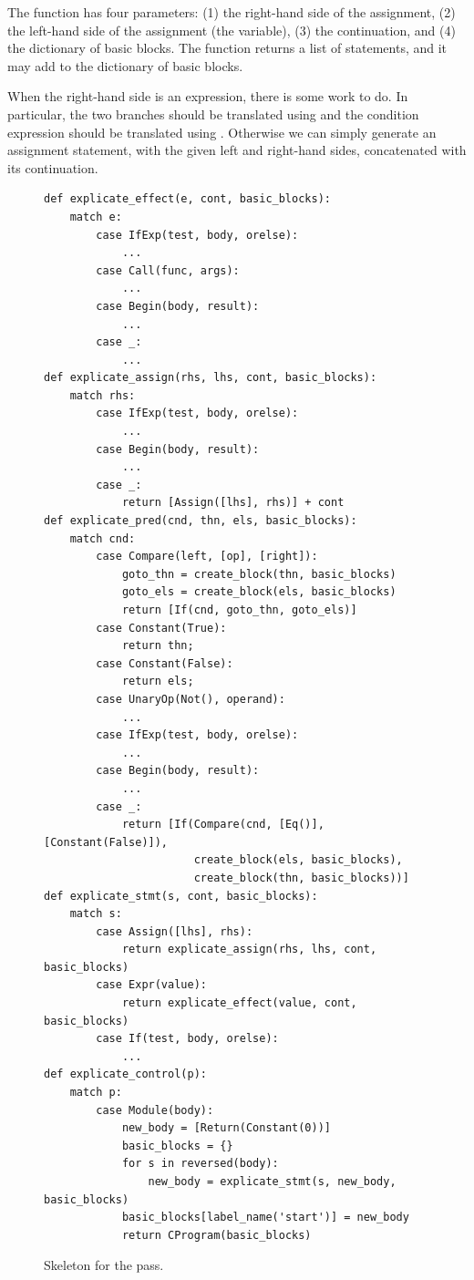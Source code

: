 \documentclass[7x10]{TimesAPriori_MIT}%
\numberwithin{theorem}{chapter}
\numberwithin{definition}{chapter}
\numberwithin{equation}{chapter}
\begin{document}
{The  function has four parameters: (1) the
right-hand side of the assignment, (2) the left-hand side of the
assignment (the variable), (3) the continuation, and (4) the dictionary
of basic blocks. The  function returns a list
of \LangCIf{} statements, and it may add to the dictionary of basic
blocks.

When the right-hand side is an  expression, there is some
work to do. In particular, the two branches should be translated using
 and the condition expression should be
translated using .  Otherwise we can simply
generate an assignment statement, with the given left and right-hand
sides, concatenated with its continuation.

\begin{figure}[tbp]
\begin{tcolorbox}[colback=white]
\begin{lstlisting}[basicstyle=\ttfamily\footnotesize]
def explicate_effect(e, cont, basic_blocks):
    match e:
        case IfExp(test, body, orelse):
            ...
        case Call(func, args):
            ...
        case Begin(body, result):
            ...
        case _:
            ...
def explicate_assign(rhs, lhs, cont, basic_blocks):
    match rhs:
        case IfExp(test, body, orelse):
            ...
        case Begin(body, result):
            ...
        case _:
            return [Assign([lhs], rhs)] + cont
def explicate_pred(cnd, thn, els, basic_blocks):
    match cnd:
        case Compare(left, [op], [right]):
            goto_thn = create_block(thn, basic_blocks)
            goto_els = create_block(els, basic_blocks)
            return [If(cnd, goto_thn, goto_els)]
        case Constant(True):
            return thn;
        case Constant(False):
            return els;
        case UnaryOp(Not(), operand):
            ...
        case IfExp(test, body, orelse):
            ...
        case Begin(body, result):
            ...
        case _:
            return [If(Compare(cnd, [Eq()], [Constant(False)]),
                       create_block(els, basic_blocks),
                       create_block(thn, basic_blocks))]
def explicate_stmt(s, cont, basic_blocks):
    match s:
        case Assign([lhs], rhs):
            return explicate_assign(rhs, lhs, cont, basic_blocks)
        case Expr(value):
            return explicate_effect(value, cont, basic_blocks)
        case If(test, body, orelse):
            ...
def explicate_control(p):
    match p:
        case Module(body):
            new_body = [Return(Constant(0))]
            basic_blocks = {}
            for s in reversed(body):
                new_body = explicate_stmt(s, new_body, basic_blocks)
            basic_blocks[label_name('start')] = new_body
            return CProgram(basic_blocks)
\end{lstlisting}
\end{tcolorbox}
\caption{Skeleton for the  pass.}
\label{fig:explicate-control-Lif}
\end{figure}
\fi}
\end{document}
